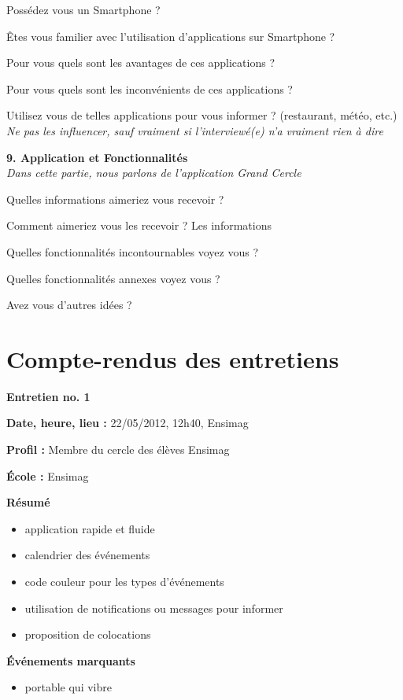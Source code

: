 \documentclass[a4paper, 11px]{article}
\begin{document}
Possédez vous un Smartphone ?

Êtes vous familier avec l'utilisation d'applications sur Smartphone ?

Pour vous quels sont les avantages de ces applications ?

Pour vous quels sont les inconvénients de ces applications ?

Utilisez vous de telles applications pour vous informer ? (restaurant, météo, etc.)
\textit {Ne pas les influencer, sauf vraiment si l'interviewé(e) n'a vraiment rien à dire}


\vspace{.3cm}

 \textbf {\large 9. Application et Fonctionnalités}\\
\textit{Dans cette partie, nous parlons de l'application Grand Cercle}

Quelles informations aimeriez vous recevoir ?


Comment aimeriez vous les recevoir ?
Les informations


Quelles fonctionnalités incontournables voyez vous ?


Quelles fonctionnalités annexes voyez vous ?


Avez vous d'autres idées ?

\newpage

\section{Compte-rendus des entretiens}

 \textbf {\large Entretien no. 1}

\textbf{Date, heure, lieu : }
22/05/2012, 12h40, Ensimag

\textbf{Profil : }
Membre du cercle des élèves Ensimag

\textbf{École : }
Ensimag

\textbf{Résumé}

	\begin{itemize}
		\item application rapide et fluide
		\item calendrier des événements
		\item code couleur pour les types d'événements
		\item utilisation de notifications ou messages pour informer
		\item proposition de colocations
	\end{itemize}

\vspace{.25cm}
\textbf{Événements marquants}	
	\begin{itemize}
		\item portable qui vibre
	\end{itemize}
\end{document}
